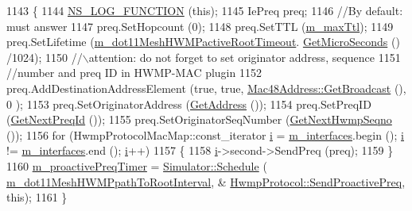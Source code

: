 \begin{DoxyCode}
1143 \{
1144   \hyperlink{log-macros-disabled_8h_a90b90d5bad1f39cb1b64923ea94c0761}{NS\_LOG\_FUNCTION} (\textcolor{keyword}{this});
1145   IePreq preq;
1146   \textcolor{comment}{//By default: must answer}
1147   preq.SetHopcount (0);
1148   preq.SetTTL (\hyperlink{classns3_1_1dot11s_1_1HwmpProtocol_aeb6a1f36357cb71cf8d41749f65a3edc}{m\_maxTtl});
1149   preq.SetLifetime (\hyperlink{classns3_1_1dot11s_1_1HwmpProtocol_ac00e9fdbf81e8597acc90b02ba3455a9}{m\_dot11MeshHWMPactiveRootTimeout}.
      \hyperlink{classns3_1_1Time_a2542b9273c336da11fcaf54e8bc6e4c8}{GetMicroSeconds} () /1024);
1150   \textcolor{comment}{//\(\backslash\)attention: do not forget to set originator address, sequence}
1151   \textcolor{comment}{//number and preq ID in HWMP-MAC plugin}
1152   preq.AddDestinationAddressElement (\textcolor{keyword}{true}, \textcolor{keyword}{true}, \hyperlink{classns3_1_1Mac48Address_a55156e302c6bf950c0b558365adbde84}{Mac48Address::GetBroadcast} (), 0
      );
1153   preq.SetOriginatorAddress (\hyperlink{classns3_1_1dot11s_1_1HwmpProtocol_ab8b2c6d98ae278406f543e25feca8ccc}{GetAddress} ());
1154   preq.SetPreqID (\hyperlink{classns3_1_1dot11s_1_1HwmpProtocol_a9aad7787e0238e8c90decec8ab4d96ad}{GetNextPreqId} ());
1155   preq.SetOriginatorSeqNumber (\hyperlink{classns3_1_1dot11s_1_1HwmpProtocol_a1b627657878666de9b9c913d82c35853}{GetNextHwmpSeqno} ());
1156   \textcolor{keywordflow}{for} (HwmpProtocolMacMap::const\_iterator \hyperlink{bernuolliDistribution_8m_a6f6ccfcf58b31cb6412107d9d5281426}{i} = \hyperlink{classns3_1_1dot11s_1_1HwmpProtocol_ae2cee085d1d2b9d32b509b710c0b4511}{m\_interfaces}.begin (); 
      \hyperlink{bernuolliDistribution_8m_a6f6ccfcf58b31cb6412107d9d5281426}{i} != \hyperlink{classns3_1_1dot11s_1_1HwmpProtocol_ae2cee085d1d2b9d32b509b710c0b4511}{m\_interfaces}.end (); \hyperlink{bernuolliDistribution_8m_a6f6ccfcf58b31cb6412107d9d5281426}{i}++)
1157     \{
1158       \hyperlink{bernuolliDistribution_8m_a6f6ccfcf58b31cb6412107d9d5281426}{i}->second->SendPreq (preq);
1159     \}
1160   \hyperlink{classns3_1_1dot11s_1_1HwmpProtocol_a9788adc340b2abf12aae651c911bd74f}{m\_proactivePreqTimer} = \hyperlink{classns3_1_1Simulator_a671882c894a08af4a5e91181bf1eec13}{Simulator::Schedule} (
      \hyperlink{classns3_1_1dot11s_1_1HwmpProtocol_ab01e8ec195410954227b273627e1d733}{m\_dot11MeshHWMPpathToRootInterval}, &
      \hyperlink{classns3_1_1dot11s_1_1HwmpProtocol_aa441183b0679939c73535bd256e8d0d0}{HwmpProtocol::SendProactivePreq}, \textcolor{keyword}{this});
1161 \}
\end{DoxyCode}


